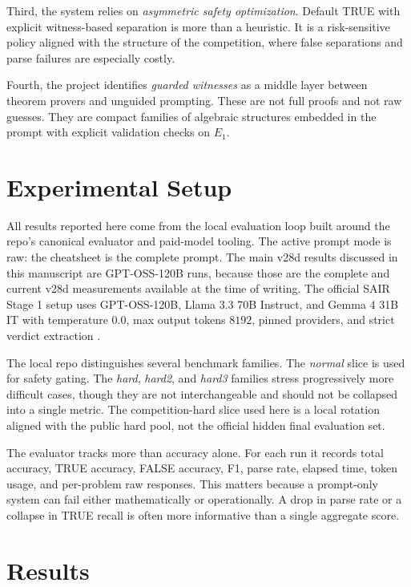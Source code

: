\documentclass[12pt]{amsart}
\begin{document}
Third, the system relies on \emph{asymmetric safety optimization}. Default TRUE with explicit witness-based separation is more than a heuristic. It is a risk-sensitive policy aligned with the structure of the competition, where false separations and parse failures are especially costly.

Fourth, the project identifies \emph{guarded witnesses} as a middle layer between theorem provers and unguided prompting. These are not full proofs and not raw guesses. They are compact families of algebraic structures embedded in the prompt with explicit validation checks on $E_1$.

\section{Experimental Setup}

All results reported here come from the local evaluation loop built around the repo's canonical evaluator and paid-model tooling. The active prompt mode is raw: the cheatsheet is the complete prompt. The main v28d results discussed in this manuscript are GPT-OSS-120B runs, because those are the complete and current v28d measurements available at the time of writing. The official SAIR Stage 1 setup uses GPT-OSS-120B, Llama 3.3 70B Instruct, and Gemma 4 31B IT with temperature $0.0$, max output tokens $8192$, pinned providers, and strict verdict extraction \cite{SAIRJudge2026}.

The local repo distinguishes several benchmark families. The \emph{normal} slice is used for safety gating. The \emph{hard}, \emph{hard2}, and \emph{hard3} families stress progressively more difficult cases, though they are not interchangeable and should not be collapsed into a single metric. The competition-hard slice used here is a local rotation aligned with the public hard pool, not the official hidden final evaluation set.

The evaluator tracks more than accuracy alone. For each run it records total accuracy, TRUE accuracy, FALSE accuracy, F1, parse rate, elapsed time, token usage, and per-problem raw responses. This matters because a prompt-only system can fail either mathematically or operationally. A drop in parse rate or a collapse in TRUE recall is often more informative than a single aggregate score.

\section{Results}
\end{document}
